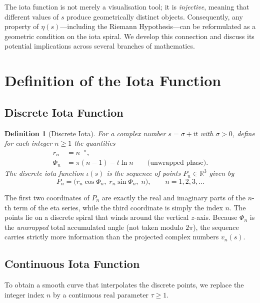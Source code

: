 \documentclass[11pt]{article}
\newtheorem{definition}[theorem]{Definition}
\newcommand{\R}{\mathbb{R}}
\newcommand{\iu}{\mathrm{i}} %
\begin{document}
The iota function is not merely a visualisation tool; it is \emph{injective}, meaning that different values of $s$ produce geometrically distinct objects.  Consequently, any property of $\eta(s)$—including the Riemann Hypothesis—can be reformulated as a geometric condition on the iota spiral.  We develop this connection and discuss its potential implications across several branches of mathematics.

\section{Definition of the Iota Function}

\subsection{Discrete Iota Function}

\begin{definition}[Discrete Iota]\label{def:iota_discrete}
  For a complex number $s = \sigma + \iu t$ with $\sigma > 0$, define for each integer $n \ge 1$ the quantities
  \begin{align}
    r_n &= n^{-\sigma}, \label{eq:radius}\\
    \Phi_n &= \pi(n-1) - t \ln n \qquad \text{(unwrapped phase)}. \label{eq:phase}
  \end{align}
  The \emph{discrete iota function} $\iota(s)$ is the sequence of points $P_n \in \R^3$ given by
  \begin{equation}
    P_n = \bigl( r_n \cos\Phi_n,\; r_n \sin\Phi_n,\; n \bigr), \qquad n = 1,2,3,\dots \label{eq:iota_disc}
  \end{equation}
\end{definition}

The first two coordinates of $P_n$ are exactly the real and imaginary parts of the $n$-th term of the eta series, while the third coordinate is simply the index $n$.  The points lie on a discrete spiral that winds around the vertical $z$-axis.  Because $\Phi_n$ is the \emph{unwrapped} total accumulated angle (not taken modulo $2\pi$), the sequence carries strictly more information than the projected complex numbers $v_n(s)$.

\subsection{Continuous Iota Function}

To obtain a smooth curve that interpolates the discrete points, we replace the integer index $n$ by a continuous real parameter $\tau \ge 1$.
\end{document}
